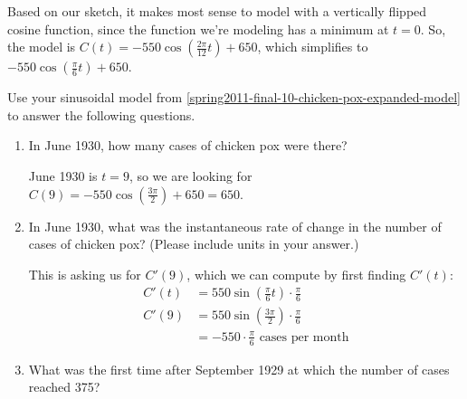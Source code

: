 \documentclass{article}
\begin{document}
\begin{enumerate}
\begin{enumerate}
\begin{solution}
      Based on our sketch, it makes most sense to model with a vertically
      flipped cosine function, since the function we're modeling has a
      minimum at $t = 0$.  So, the model is $C(t) = -550 \cos \left(
        \frac{2 \pi}{12} t \right) + 650$, which simplifies to $\boxed{-550
        \cos \left( \frac{\pi}{6} t \right) + 650}$.
    \end{solution}

  \end{enumerate}
  Use your sinusoidal model from
  \ref{spring2011-final-10-chicken-pox-expanded-model} to answer the
  following questions. 
  \begin{enumerate}[resume]
  \item
    \begin{problem}[0.75in]
      In June 1930, how many cases of chicken pox were there?
    \end{problem}

    \begin{solution}
      June 1930 is $t = 9$, so we are looking for $C(9) = -550 \cos \left(
        \frac{3 \pi}{2} \right) + 650 = \boxed{650}$.
    \end{solution}

  \item
    \begin{problem}[\vfill\newpage]
      In June 1930, what was the instantaneous rate of change in the
      number of cases of chicken pox?  (Please include units in your
      answer.)
    \end{problem}

    \begin{solution}
      This is asking us for $C'(9)$, which we can compute by first finding
      $C'(t)$: 
      \begin{align*}
        C'(t) &= 550 \sin \left( \frac{\pi}{6} t \right) \cdot
        \frac{\pi}{6} \\
        C'(9) &= 550 \sin \left( \frac{3 \pi}{2} \right) \cdot
        \frac{\pi}{6} \\
        &= \boxed{-550 \cdot \frac{\pi}{6} \text{ cases per month}}
      \end{align*}
    \end{solution}

  \item
    \begin{problem}[\vfill]
      What was the first time after September 1929 at which the number of
      cases reached 375?
    \end{problem}


\end{enumerate}
\end{enumerate}
\end{document}

